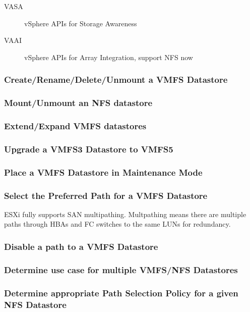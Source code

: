 \begin{description}

\item[VASA] vSphere APIs for Storage Awareness

\item[VAAI] vSphere APIs for Array Integration, support NFS now

\end{description}

\subsubsection{Create/Rename/Delete/Unmount a VMFS Datastore}

\subsubsection{Mount/Unmount an NFS datastore}

\subsubsection{Extend/Expand VMFS datastores}

\subsubsection{Upgrade a VMFS3 Datastore to VMFS5}

\subsubsection{Place a VMFS Datastore in Maintenance Mode}

\subsubsection{Select the Preferred Path for a VMFS Datastore}

ESXi fully supports SAN multipathing. Multpathing means there are multiple
paths through HBAs and FC switches to the same LUNs for redundancy.

\subsubsection{Disable a path to a VMFS Datastore}

\subsubsection{Determine use case for multiple VMFS/NFS Datastores}

\subsubsection{Determine appropriate Path Selection Policy for a given NFS Datastore}
